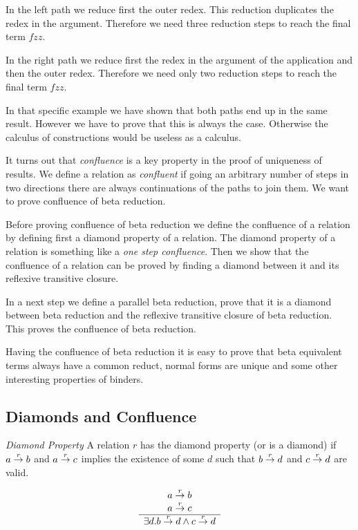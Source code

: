 In the left path we reduce first the outer redex. This reduction duplicates the
redex in the argument. Therefore we need three reduction steps to reach the
final term $f z z$.

In the right path we reduce first the redex in the argument of the application
and then the outer redex. Therefore we need only two reduction steps to reach
the final term $f z z$.

In that specific example we have shown that both paths end up in the same
result. However we have to prove that this is always the case. Otherwise the
calculus of constructions would be useless as a calculus.

It turns out that \emph{confluence} is a key property in the proof of uniqueness
of results. We define a relation as \emph{confluent} if going an arbitrary
number of steps in two directions there are always continuations of the paths to
join them.  We want to prove confluence of beta reduction.

Before proving confluence of beta reduction we define the confluence of a
relation by defining first a diamond property of a relation. The diamond
property of a relation is something like a \emph{one step confluence}. Then we
show that the confluence of a relation can be proved by finding a diamond
between it and its reflexive transitive closure.

In a next step we define a parallel beta reduction, prove that it is a diamond
between beta reduction and the reflexive transitive closure of beta reduction.
This proves the confluence of beta reduction.

Having the confluence of beta reduction it is easy to prove that beta equivalent
terms always have a common reduct, normal forms are unique and some other
interesting properties of binders.





\subsection{Diamonds and Confluence}


\begin{definition}
    \emph{Diamond Property} A relation $r$ has the diamond property (or is a
    diamond) if $a \stackrel{r}{\to} b$ and $a \stackrel{r}{\to} c$ implies the existence of
    some $d$ such that $b \stackrel{r}{\to} d$ and $c \stackrel{r}{\to} d$ are valid.

    $$
    \begin{array}{c} 
        a \stackrel{r}{\to} b
        \\
        a \stackrel{r}{\to} c
     \\ \hline 
        \exists d. b \stackrel{r}{\to} d \land c \stackrel{r}{\to} d
    \end{array}
    $$
\end{definition}

